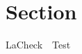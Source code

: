 \documentclass{article}
\begin{document}
\section{Section} \label{section}
LaCheck~~Test

\end{document}
